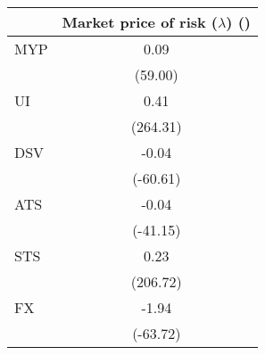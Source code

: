 \begin{tabular}{l*{1}{c}}
\hline
\hline
& Market price of risk ($\lambda$) (\times 100)\\
\hline
MYP & 0.09\\
   & (59.00)\\
UI & 0.41\\
   & (264.31)\\
DSV & -0.04\\
   & (-60.61)\\
ATS & -0.04\\
   & (-41.15)\\
STS & 0.23\\
   & (206.72)\\
FX & -1.94\\
   & (-63.72)\\
\hline
\hline
\end{tabular}
